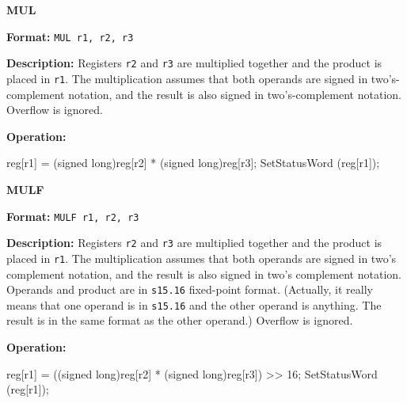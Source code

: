 \noindent\textsf{\textbf{\Large MUL}}\par
{}\par\begin{indented}{\bf Format:}
{\tt MUL r1, r2, r3}\par\vspace{3ex}
\end{indented}\vspace{4ex}
\begin{indented}{\bf Description:}
Registers {\tt r2} and {\tt r3} are multiplied together and the product is
placed in {\tt r1}.  The multiplication assumes that both operands are
signed in two's-complement notation, and the result is also signed in
two's-complement notation.  Overflow is ignored.
\end{indented}
\begin{indented}{\bf Operation:}\vspace{.8ex}
\begin{verbatimtab}
reg[r1] = (signed long)reg[r2] * (signed long)reg[r3];
SetStatusWord (reg[r1]);
\end{verbatimtab}
\end{indented}
\vspace{2em}

\newpage
\noindent\textsf{\textbf{\Large MULF}}\par
{}\par\begin{indented}{\bf Format:}
{\tt MULF r1, r2, r3}\par\vspace{3ex}
\end{indented}\vspace{4ex}
\begin{indented}{\bf Description:}
Registers {\tt r2} and {\tt r3} are multiplied together and the product is
placed in {\tt r1}.  The multiplication assumes that both operands are
signed in two's complement notation, and the result is also signed in
two's complement notation.  Operands and product are in {\tt s15.16}
fixed-point format.  (Actually, it really means that one operand is in
{\tt s15.16} and the other operand is anything.  The result is in the
same format as the other operand.)  Overflow is ignored.
\end{indented}
\begin{indented}{\bf Operation:}\vspace{.8ex}
\begin{verbatimtab}
reg[r1] = ((signed long)reg[r2] * (signed long)reg[r3]) >> 16;
SetStatusWord (reg[r1]);
\end{verbatimtab}
\end{indented}
\vspace{2em}

